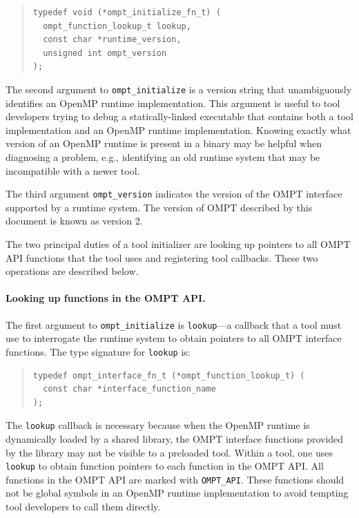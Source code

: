 \documentclass{article}
\begin{document}
\begin{quote}
\begin{verbatim}
typedef void (*ompt_initialize_fn_t) (
  ompt_function_lookup_t lookup,
  const char *runtime_version, 
  unsigned int ompt_version
);
\end{verbatim}
\end{quote}
The second argument to  \verb|ompt_initialize| is a version string that unambiguously identifies an OpenMP runtime implementation. This argument is useful to tool developers trying to debug a statically-linked executable that contains both a tool implementation and an OpenMP runtime implementation. Knowing exactly what version of an OpenMP runtime is present in a binary may be helpful when diagnosing a problem, e.g., identifying an old runtime system that may be incompatible with a newer tool.

The third argument \verb|ompt_version| indicates the version of the OMPT interface supported by a runtime system.
The version of OMPT described by this document is known as version 2.

The two principal duties of a tool initializer are looking up pointers to all OMPT API functions that the tool uses and registering tool callbacks.  These two operations are described below.

\paragraph{Looking up functions in the OMPT API.} The first argument to \verb|ompt_initialize| is \verb|lookup|---a callback that a tool must use to interrogate the runtime system to obtain pointers to all OMPT interface functions.
The type signature for  \verb|lookup| is:

\begin{quote}
\begin{verbatim}
typedef ompt_interface_fn_t (*ompt_function_lookup_t) (
  const char *interface_function_name
);
\end{verbatim}
\end{quote}

\noindent
The \verb|lookup| callback is necessary because when the OpenMP runtime is dynamically loaded by a shared library, the OMPT interface functions provided by the library may not be visible to a preloaded tool. Within a tool, one uses \verb|lookup| to obtain function pointers to each function in the OMPT API.  All functions in the OMPT API are marked with \verb|OMPT_API|. These functions should not be global symbols in an OpenMP runtime implementation to avoid tempting tool developers to call them directly. 
\end{document}
